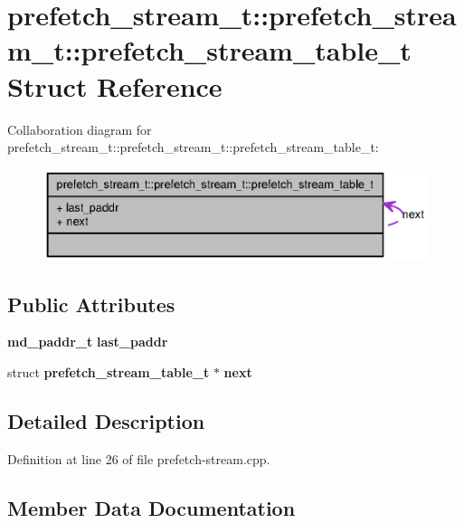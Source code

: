 \section{prefetch\_\-stream\_\-t::prefetch\_\-stream\_\-t::prefetch\_\-stream\_\-table\_\-t Struct Reference}
\label{structprefetch__stream__t_1_1prefetch__stream__table__t}
Collaboration diagram for prefetch\_\-stream\_\-t::prefetch\_\-stream\_\-t::prefetch\_\-stream\_\-table\_\-t:\nopagebreak
\begin{figure}[H]
\begin{center}
\leavevmode
\includegraphics[width=371pt]{structprefetch__stream__t_1_1prefetch__stream__table__t__coll__graph}
\end{center}
\end{figure}
\subsection*{Public Attributes}
\begin{CompactItemize}
\item 
{\bf md\_\-paddr\_\-t} {\bf last\_\-paddr}
\item 
struct {\bf prefetch\_\-stream\_\-table\_\-t} $\ast$ {\bf next}
\end{CompactItemize}


\subsection{Detailed Description}


Definition at line 26 of file prefetch-stream.cpp.

\subsection{Member Data Documentation}

